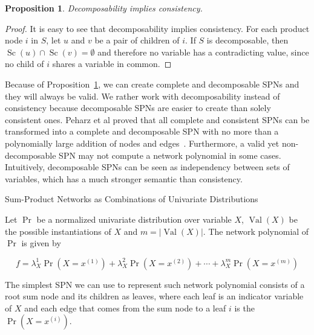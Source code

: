 \documentclass{amsart}
\makeatletter
\def\subsection{\@startsection{subsection}{3}%
  \z@{.5\linespacing\@plus.7\linespacing}{.1\linespacing}%
  {\normalfont\itshape}}
\DeclareMathOperator*{\Val}{\text{Val}}
\DeclareMathOperator*{\Sc}{\text{Sc}}
\theoremstyle{plain}
\newcounter{dummy-def}\numberwithin{dummy-def}{section}
\newcounter{dummy-thm}\numberwithin{dummy-thm}{section}
\newcounter{dummy-prop}\numberwithin{dummy-prop}{section}
\newtheorem{proposition}[dummy-prop]{Proposition}
\newcounter{dummy-ex}\numberwithin{dummy-ex}{section}
\newcounter{dummy-eg}\numberwithin{dummy-eg}{section}
\numberwithin{equation}{section}
\makeatother
\begin{document}
\begin{proposition}\label{decimpliescons}
  Decomposability implies consistency.
\end{proposition}

\begin{proof}
  It is easy to see that decomposability implies consistency. For each product node $i$ in $S$,
  let $u$ and $v$ be a pair of children of $i$. If $S$ is decomposable, then $\Sc(u)\cap\Sc(v)=
  \emptyset$ and therefore no variable has a contradicting value, since no child of $i$ shares a
  variable in common.
\end{proof}

Because of Proposition~\ref{decimpliescons}, we can create complete and decomposable SPNs and they
will always be valid. We rather work with decomposability instead of consistency because
decomposable SPNs are easier to create than solely consistent ones. Peharz et al proved that
all complete and consistent SPNs can be transformed into a complete and decomposable SPN with no
more than a polynomially large addition of nodes and edges~\cite{theoretical-spn}. Furthermore, a
valid yet non-decomposable SPN may not compute a network polynomial in some cases. Intuitively,
decomposable SPNs can be seen as independency between sets of variables, which has a much stronger
semantic than consistency.

\subsection{Sum-Product Networks as Combinations of Univariate Distributions}

Let $\Pr$ be a normalized univariate distribution over variable $X$, $\Val(X)$ be the possible
instantiations of $X$ and $m=|\Val(X)|$. The network polynomial of $\Pr$ is given by

\begin{equation*}
  f=\lambda_X^1\Pr(X=x^{(1)})+\lambda_X^2\Pr(X=x^{(2)})+\cdots+\lambda_X^m\Pr(X=x^{(m)})
\end{equation*}

The simplest SPN we can use to represent such network polynomial consists of a root sum node and
its children as leaves, where each leaf is an indicator variable of $X$ and each edge that comes
from the sum node to a leaf $i$ is the $\Pr(X=x^{(i)})$.

\begin{center}
  
\end{center}
\end{document}
